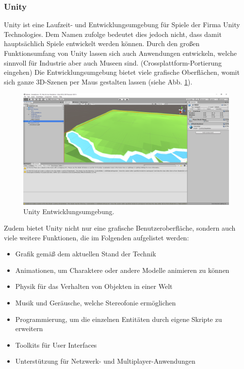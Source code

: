 \documentclass[a4paper,12pt,oneside]{article}
\begin{document}
      \subsubsection{Unity}
        Unity ist eine Laufzeit- und Entwicklungsumgebung für Spiele der Firma Unity
        Technologies. Dem Namen zufolge bedeutet dies jedoch nicht, dass damit 
        hauptsächlich Spiele entwickelt werden können. 
        Durch den großen Funktionsumfang von Unity lassen sich auch
        Anwendungen entwickeln, welche sinnvoll für Industrie aber auch Museen sind.
        (Crossplattform-Portierung eingehen)
        Die Entwicklungsumgebung bietet viele grafische Oberflächen, womit sich ganze
        3D-Szenen per Maus gestalten lassen (siehe Abb. \ref{fig:unity1}). 
        \begin{figure}[t]
          \centering
          \includegraphics[scale=0.3]{img/unity1.png}
          \caption{Unity Entwicklungsumgebung.}
          \label{fig:unity1}
        \end{figure}
        Zudem bietet Unity nicht nur eine grafische Benutzeroberfläche, 
        sondern auch viele weitere Funktionen, die im Folgenden aufgelistet werden:
        \begin{itemize}
          \item Grafik gemäß dem aktuellen Stand der Technik
          \item Animationen, um Charaktere oder andere Modelle animieren zu können
          \item Physik für das Verhalten von Objekten in einer Welt
          \item Musik und Geräusche, welche Stereofonie ermöglichen
          \item Programmierung, um die einzelnen Entitäten durch eigene Skripte
          zu erweitern
          \item Toolkits für User Interfaces
          \item Unterstützung für Netzwerk- und Multiplayer-Anwendungen
        \end{itemize}
\end{document}
